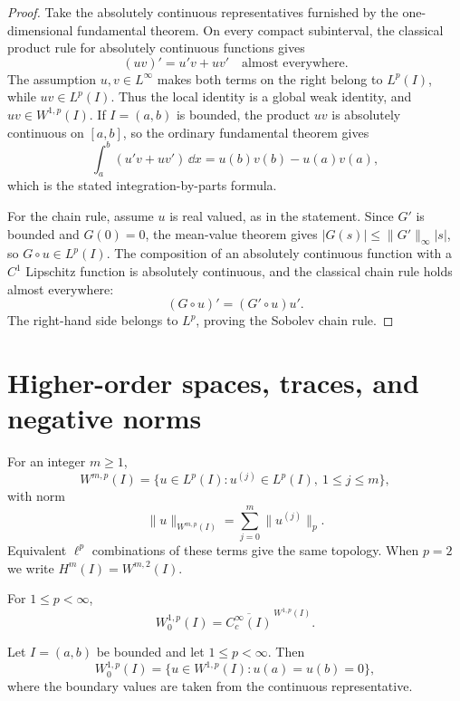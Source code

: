 \begin{proof}
Take the absolutely continuous representatives furnished by the
one-dimensional fundamental theorem.  On every compact subinterval, the
classical product rule for absolutely continuous functions gives
\[
  (uv)'=u'v+uv'
  \quad\text{almost everywhere}.
\]
The assumption $u,v\in L^\infty$ makes both terms on the right belong to
$L^p(I)$, while $uv\in L^p(I)$.  Thus the local identity is a global weak
identity, and $uv\in W^{1,p}(I)$.  If $I=(a,b)$ is bounded, the product $uv$
is absolutely continuous on $[a,b]$, so the ordinary fundamental theorem gives
\[
  \int_a^b(u'v+uv')\,\dd x=u(b)v(b)-u(a)v(a),
\]
which is the stated integration-by-parts formula.

For the chain rule, assume $u$ is real valued, as in the statement.  Since
$G'$ is bounded and $G(0)=0$, the mean-value theorem gives
$|G(s)|\le\|G'\|_\infty|s|$, so $G\circ u\in L^p(I)$.  The composition of an
absolutely continuous function with a $C^1$ Lipschitz function is absolutely
continuous, and the classical chain rule holds almost everywhere:
\[
  (G\circ u)'=(G'\circ u)u'.
\]
The right-hand side belongs to $L^p$, proving the Sobolev chain rule.
\end{proof}

\section{Higher-order spaces, traces, and negative norms}

\begin{notedefinition}
For an integer $m\ge1$,
\[
  W^{m,p}(I)
  =\{u\in L^p(I):u^{(j)}\in L^p(I),\ 1\le j\le m\},
\]
with norm
\[
  \|u\|_{W^{m,p}(I)}
  =\sum_{j=0}^m\|u^{(j)}\|_p.
\]
Equivalent $\ell^p$ combinations of these terms give the same topology.
When $p=2$ we write $H^m(I)=W^{m,2}(I)$.
\end{notedefinition}

\begin{notedefinition}
For $1\le p<\infty$,
\[
  W_0^{1,p}(I)=\overline{C_c^\infty(I)}^{\,W^{1,p}(I)}.
\]
\end{notedefinition}

\begin{notetheorem}
Let $I=(a,b)$ be bounded and let $1\le p<\infty$.  Then
\[
  W_0^{1,p}(I)
  =\{u\in W^{1,p}(I):u(a)=u(b)=0\},
\]
where the boundary values are taken from the continuous representative.
\end{notetheorem}

